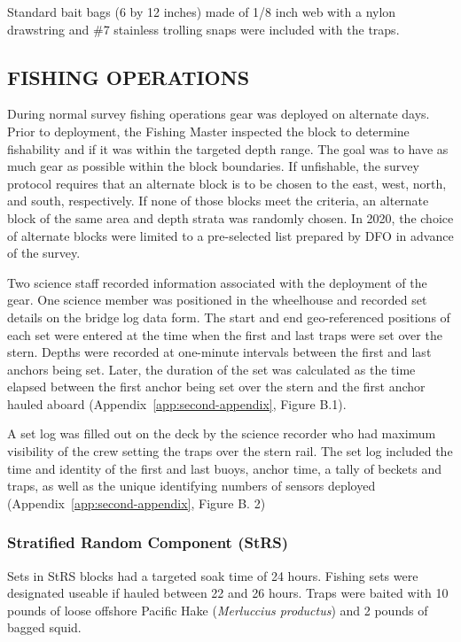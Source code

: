 \documentclass[12pt]{article}\usepackage[]{graphicx}\usepackage[]{color}
\begin{document}
Standard bait bags (6 by 12 inches) made of 1/8 inch web with a nylon drawstring and \#7 stainless trolling snaps were included with the traps.

\hypertarget{fishing-operations}{%
\subsection{FISHING OPERATIONS}\label{fishing-operations}}

During normal survey fishing operations gear was deployed on alternate days. Prior to deployment, the Fishing Master inspected the block to determine fishability and if it was within the targeted depth range. The goal was to have as much gear as possible within the block boundaries. If unfishable, the survey protocol requires that an alternate block is to be chosen to the east, west, north, and south, respectively. If none of those blocks meet the criteria, an alternate block of the same area and depth strata was randomly chosen. In 2020, the choice of alternate blocks were limited to a pre-selected list prepared by DFO in advance of the survey.

Two science staff recorded information associated with the deployment of the gear. One science member was positioned in the wheelhouse and recorded set details on the bridge log data form. The start and end geo-referenced positions of each set were entered at the time when the first and last traps were set over the stern. Depths were recorded at one-minute intervals between the first and last anchors being set. Later, the duration of the set was calculated as the time elapsed between the first anchor being set over the stern and the first anchor hauled aboard (Appendix~\ref{app:second-appendix}, Figure B.1).

A set log was filled out on the deck by the science recorder who had maximum visibility of the crew setting the traps over the stern rail. The set log included the time and identity of the first and last buoys, anchor time, a tally of beckets and traps, as well as the unique identifying numbers of sensors deployed (Appendix~\ref{app:second-appendix}, Figure B. 2)

\hypertarget{stratified-random-component-strs}{%
\subsubsection{Stratified Random Component (StRS)}\label{stratified-random-component-strs}}

Sets in StRS blocks had a targeted soak time of 24 hours. Fishing sets were designated useable if hauled between 22 and 26 hours. Traps were baited with 10 pounds of loose offshore Pacific Hake (\emph{Merluccius productus}) and 2 pounds of bagged squid.
\end{document}
